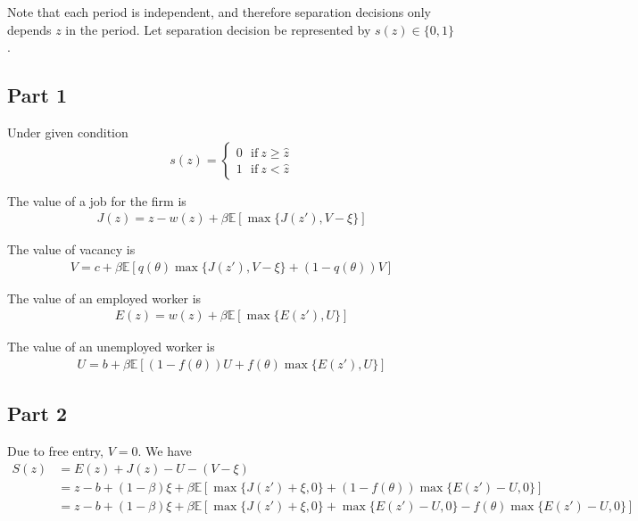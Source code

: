 Note that each period is independent, and therefore separation decisions only depends $z$ in the period. Let separation decision be represented by $s(z) \in \{0,1\}$.\\

\subsection*{Part 1}

Under given condition
\begin{equation*}
    s(z) = \begin{cases}
        0 ~~~\text{if}~ z \ge \hat z\\
        1 ~~~\text{if}~ z < \hat z
    \end{cases}
\end{equation*}

The value of a job for the firm is
\begin{align*}
    J(z) = z - w(z) + \beta \mathbb E\left[ \max\{J(z'), V-\xi\}    \right]
\end{align*}

The value of vacancy is 
\begin{align*}
    V = c  + \beta \mathbb E[q(\theta) \max\{J(z'), V-\xi\}  + (1-q(\theta))V]
\end{align*}

The value of an employed worker is 
\begin{align*}
    E(z) = w(z) + \beta \mathbb E[ \max\{E(z'), U\}]
\end{align*}

The value of an unemployed worker is 
\begin{align*}
    U = b + \beta \mathbb E[ (1-f(\theta))U + f(\theta) \max\{E(z'), U\}]
\end{align*}


\subsection*{Part 2}

Due to free entry, $V = 0$. We have 
\begin{align*}
    S(z) &= E(z) + J(z) - U - (V-\xi)    \\
    &= z -b + (1-\beta) \xi + \beta \mathbb E \left[ \max\{J(z')+\xi, 0\} + (1-f(\theta))\max\{E(z')-U, 0\} \right]\\
    &= z -b + (1-\beta) \xi + \beta \mathbb E \left[ \max\{J(z')+\xi, 0\} +  \max\{E(z')-U, 0\} - f(\theta)\max\{E(z')-U, 0\} \right]
\end{align*}

